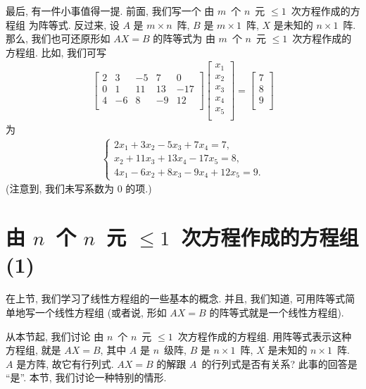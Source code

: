最后, 有一件小事值得一提.
前面, 我们写一个%
由 \(m\)~个 \(n\)~元 \({\leq} 1\)~次方程作成的方程组%
为阵等式.
反过来,
设 \(A\) 是 \(m \times n\)~阵,
\(B\) 是 \(m \times 1\)~阵,
\(X\) 是未知的 \(n \times 1\)~阵.
那么, 我们也可还原形如 \(AX = B\) 的阵等式为%
由 \(m\)~个 \(n\)~元 \({\leq} 1\)~次方程作成的方程组.
比如, 我们可写
\begin{align*}
    \begin{bmatrix}
        2 & 3  & -5 & 7  & 0   \\
        0 & 1  & 11 & 13 & -17 \\
        4 & -6 & 8  & -9 & 12  \\
    \end{bmatrix}
    \begin{bmatrix}
        x_1 \\
        x_2 \\
        x_3 \\
        x_4 \\
        x_5 \\
    \end{bmatrix}
    =
    \begin{bmatrix}
        7 \\
        8 \\
        9 \\
    \end{bmatrix}
\end{align*}
为
\begin{align*}
    \begin{cases}
        2x_1 + 3x_2 - 5x_3 + 7x_4 = 7,   \\
        x_2 + 11x_3 + 13x_4 - 17x_5 = 8, \\
        4x_1 - 6x_2 + 8x_3 - 9x_4 + 12x_5 = 9.
    \end{cases}
\end{align*}
(注意到, 我们未写系数为 \(0\) 的项.)

\section{\texorpdfstring{由 \(n\)~个 \(n\)~元
      \({\leq} 1\)~次方程作成的方程组 (1)}%
  {由 n 个 n 元 ≤1 次方程作成的方程组 (1)}}

在上节, 我们学习了线性方程组的一些基本的概念.
并且, 我们知道, 可用阵等式简单地写一个线性方程组
(或者说, 形如 \(AX = B\) 的阵等式就是一个线性方程组).

从本节起, 我们讨论%
由 \(n\)~个 \(n\)~元 \({\leq} 1\)~次方程作成的方程组.
用阵等式表示这种方程组,
就是 \(AX = B\),
其中 \(A\) 是 \(n\)~级阵,
\(B\) 是 \(n \times 1\)~阵,
\(X\) 是未知的 \(n \times 1\)~阵.
\(A\) 是方阵, 故它有行列式.
\(AX = B\) 的解跟 \(A\)~的行列式是否有关系?
此事的回答是 ``是''.
本节, 我们讨论一种特别的情形.

